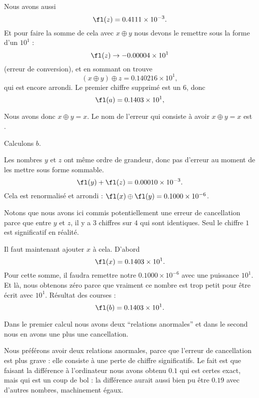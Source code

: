 \begin{example}
	Nous avons aussi
	\begin{equation}
		\fl(z)=0.4111\times 10^{-3}.
	\end{equation}
	Et pour faire la somme de cela avec \( x\oplus y\) nous devons le remettre sous la forme d'un \( 10^1\) :
	\begin{equation}
		\fl(z)\to -0.00004\times 10^1
	\end{equation}
	(erreur de conversion), et en sommant on trouve
	\begin{equation}
		(x\oplus y)\oplus z=0.140216\times 10^1,
	\end{equation}
	qui est encore arrondi. Le premier chiffre supprimé est un \( 6\), donc
	\begin{equation}
		\fl(a)=0.1403\times 10^1,
	\end{equation}

	Nous avons donc \( x\oplus y=x\). Le nom de l'erreur qui consiste à avoir \( x\oplus y=x\) est .

	Calculons \( b\).

	Les nombres \( y\) et \( z\) ont même ordre de grandeur, donc pas d'erreur au moment de les mettre sous forme sommable.
	\begin{equation}
		\fl(y)+\fl(z)=0.00010\times 10^{-3}.
	\end{equation}
	Cela est renormalisé et arrondi : \( \fl(x)\oplus\fl(y)=0.1000\times 10^{-6}\).

	Notons que nous avons ici commis potentiellement une erreur de cancellation parce que entre \( y\) et \( z\), il y a \( 3\) chiffres sur \( 4\) qui sont identiques. Seul le chiffre \( 1\) est significatif en réalité.

	Il faut maintenant ajouter \( x\) à cela. D'abord
	\begin{equation}
		\fl(x)=0.1403\times 10^1.
	\end{equation}
	Pour cette somme, il faudra remettre notre \( 0.1000\times 10^{-6}\) avec une puissance \( 10^1\). Et là, nous obtenons zéro parce que vraiment ce nombre est trop petit pour être écrit avec \( 10^1\). Résultat des courses :
	\begin{equation}
		\fl(b)=0.1403\times 10^1.
	\end{equation}


	Dans le premier calcul nous avons deux ``relations anormales'' et dans le second nous en avons une plus une cancellation.

	Nous préférons avoir deux relations anormales, parce que l'erreur de cancellation est plus grave : elle consiste à une perte de chiffre significatifs. Le fait est que faisant la différence à l'ordinateur nous avons obtenu \( 0.1\) qui est certes exact, mais qui est un coup de bol : la différence aurait aussi bien pu être \(0.19\) avec d'autres nombres, machinement égaux.


\end{example}
